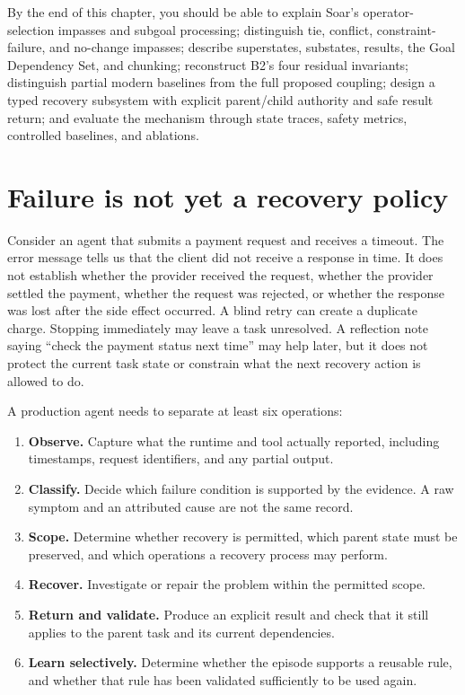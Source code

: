 \begin{learningbox}
By the end of this chapter, you should be able to explain Soar's operator-selection impasses and subgoal processing; distinguish tie, conflict, constraint-failure, and no-change impasses; describe superstates, substates, results, the Goal Dependency Set, and chunking; reconstruct B2's four residual invariants; distinguish partial modern baselines from the full proposed coupling; design a typed recovery subsystem with explicit parent/child authority and safe result return; and evaluate the mechanism through state traces, safety metrics, controlled baselines, and ablations.
\end{learningbox}

\section{Failure is not yet a recovery policy}
\label{sec:ch13-failure-policy}

Consider an agent that submits a payment request and receives a timeout. The error message tells us that the client did not receive a response in time. It does not establish whether the provider received the request, whether the provider settled the payment, whether the request was rejected, or whether the response was lost after the side effect occurred. A blind retry can create a duplicate charge. Stopping immediately may leave a task unresolved. A reflection note saying ``check the payment status next time'' may help later, but it does not protect the current task state or constrain what the next recovery action is allowed to do.

A production agent needs to separate at least six operations:

\begin{enumerate}
  \item \textbf{Observe.} Capture what the runtime and tool actually reported, including timestamps, request identifiers, and any partial output.
  \item \textbf{Classify.} Decide which failure condition is supported by the evidence. A raw symptom and an attributed cause are not the same record.
  \item \textbf{Scope.} Determine whether recovery is permitted, which parent state must be preserved, and which operations a recovery process may perform.
  \item \textbf{Recover.} Investigate or repair the problem within the permitted scope.
  \item \textbf{Return and validate.} Produce an explicit result and check that it still applies to the parent task and its current dependencies.
  \item \textbf{Learn selectively.} Determine whether the episode supports a reusable rule, and whether that rule has been validated sufficiently to be used again.
\end{enumerate}

